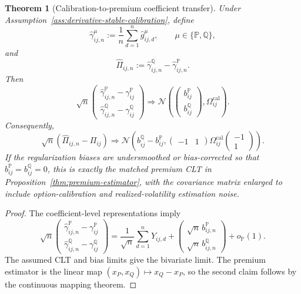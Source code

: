 \documentclass[11pt,a4paper]{amsart}
\theoremstyle{plain}
\newtheorem{theorem}{Theorem}[section]
\theoremstyle{definition}
\theoremstyle{remark}
\newcommand{\PP}{\mathbb{P}}
\newcommand{\QQ}{\mathbb{Q}}
\begin{document}
\begin{theorem}[Calibration-to-premium coefficient transfer]\label{thm:calibration-to-premium}
Under Assumption~\ref{ass:derivative-stable-calibration}, define
\[
        \widehat\gamma_{ij,n}^{\mu}
        :=
        \frac1n\sum_{d=1}^n\widehat g_{ij,d}^{\mu},
        \qquad
        \mu\in\{\PP,\QQ\},
\]
and
\[
        \widehat\Pi_{ij,n}:=\widehat\gamma_{ij,n}^{\QQ}-\widehat\gamma_{ij,n}^{\PP}.
\]
Then
\[
        \sqrt n
        \begin{pmatrix}
                \widehat\gamma_{ij,n}^{\PP}-\gamma_{ij}^{\PP}\\
                \widehat\gamma_{ij,n}^{\QQ}-\gamma_{ij}^{\QQ}
        \end{pmatrix}
        \Rightarrow
        \mathcal N\!\left(
                \begin{pmatrix}
                        b_{ij}^{\PP}\\ b_{ij}^{\QQ}
                \end{pmatrix},
                \Omega_{ij}^{\mathrm{cal}}
        \right).
\]
Consequently,
\[
        \sqrt n\left(\widehat\Pi_{ij,n}-\Pi_{ij}\right)
        \Rightarrow
        \mathcal N\!\left(
                b_{ij}^{\QQ}-b_{ij}^{\PP},
                \begin{pmatrix}-1&1\end{pmatrix}
                \Omega_{ij}^{\mathrm{cal}}
                \begin{pmatrix}-1\\1\end{pmatrix}
        \right).
\]
If the regularization biases are undersmoothed or bias-corrected so that
\(b_{ij}^{\PP}=b_{ij}^{\QQ}=0\), this is exactly the matched premium CLT in
Proposition~\ref{thm:premium-estimator}, with the covariance matrix enlarged to include
option-calibration and realized-volatility estimation noise.
\end{theorem}

\begin{proof}
The coefficient-level representations imply
\[
        \sqrt n
        \begin{pmatrix}
                \widehat\gamma_{ij,n}^{\PP}-\gamma_{ij}^{\PP}\\
                \widehat\gamma_{ij,n}^{\QQ}-\gamma_{ij}^{\QQ}
        \end{pmatrix}
        =
        \frac1{\sqrt n}\sum_{d=1}^nY_{ij,d}
        +
        \begin{pmatrix}
                \sqrt n\, b_{ij,n}^{\PP}\\
                \sqrt n\, b_{ij,n}^{\QQ}
        \end{pmatrix}
        +o_\PP(1).
\]
The assumed CLT and bias limits give the bivariate limit.  The premium estimator is the linear map
\((x_P,x_Q)\mapsto x_Q-x_P\), so the second claim follows by the continuous mapping theorem.
\end{proof}
\end{document}

